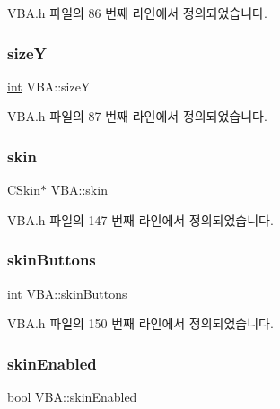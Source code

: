 V\+B\+A.\+h 파일의 86 번째 라인에서 정의되었습니다.

\mbox{\label{class_v_b_a_acb2e7221985fd0355f105cd1ec42e52e}} 
\subsubsection{\texorpdfstring{sizeY}{sizeY}}
{\footnotesize\ttfamily \mbox{\hyperlink{_util_8cpp_a0ef32aa8672df19503a49fab2d0c8071}{int}} V\+B\+A\+::sizeY}



V\+B\+A.\+h 파일의 87 번째 라인에서 정의되었습니다.

\mbox{\label{class_v_b_a_a2d80d3f19afa58047c05277aa0c18402}} 
\subsubsection{\texorpdfstring{skin}{skin}}
{\footnotesize\ttfamily \mbox{\hyperlink{class_c_skin}{C\+Skin}}$\ast$ V\+B\+A\+::skin}



V\+B\+A.\+h 파일의 147 번째 라인에서 정의되었습니다.

\mbox{\label{class_v_b_a_a18dd81b37aa33a8f580a2dabe358a280}} 
\subsubsection{\texorpdfstring{skin\+Buttons}{skinButtons}}
{\footnotesize\ttfamily \mbox{\hyperlink{_util_8cpp_a0ef32aa8672df19503a49fab2d0c8071}{int}} V\+B\+A\+::skin\+Buttons}



V\+B\+A.\+h 파일의 150 번째 라인에서 정의되었습니다.

\mbox{\label{class_v_b_a_a5cc7dbf58210b127d9e807e8a3262829}} 
\subsubsection{\texorpdfstring{skin\+Enabled}{skinEnabled}}
{\footnotesize\ttfamily bool V\+B\+A\+::skin\+Enabled}



